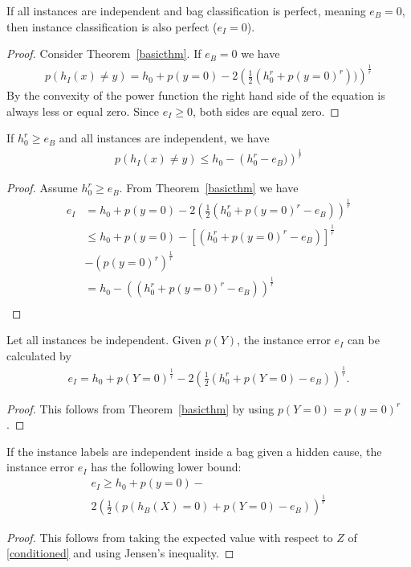 \begin{corollarya}
If all instances are independent and bag classification is perfect, meaning $e_B=0$, then instance classification is also perfect ($e_I =0$).

\begin{proof}
Consider Theorem~\ref{basicthm}. If $e_B=0$ we have
\begin{align*}
p(h_I(x) \neq y) = h_0 + p(y=0) - 2 \left (\frac{1}{2} ( h_0^r + p(y=0)^r)) \right)^\frac{1}{r}
\end{align*}
By the convexity of the power function the right hand side of the equation is always less or equal zero.
Since $e_I \geq 0$, both sides are equal zero.
\end{proof}
\end{corollarya}

\begin{theorema}
    If $h_0^r  \geq e_B$ and all instances are independent, we have
\begin{align}
    p(h_I(x)\neq y) \leq h_0 - \left ( h_0^r - e_B) \right ) ^ \frac{1}{r}
\end{align}
\begin{proof}
    Assume $h_0^r  \geq e_B$.
    From Theorem~\ref{basicthm} we have
\begin{align*}
   e_I &= h_0 + p(y=0) - 2 \left (\frac{1}{2} ( h_0^r + p(y=0)^r - e_B) \right)^\frac{1}{r}\\
   &\leq h_0 + p(y=0) - \left [( h_0^r + p(y=0)^r - e_B) \right]^\frac{1}{r}\\
   &- \left ( p(y=0)^r \right )^\frac{1}{r}\\
   &= h_0 - \left (( h_0^r + p(y=0)^r - e_B) \right)^\frac{1}{r}\\
\end{align*}
\end{proof}
\end{theorema}

\begin{theorema}
Let all instances be independent. Given $p(Y)$, the instance error $e_I$ can be calculated by
\begin{align}
e_I = h_0 + p(Y=0)^\frac{1}{r} - 2 \left (\frac{1}{2} ( h_0^r + p(Y=0) - e_B) \right)^\frac{1}{r}.
\end{align}
\begin{proof}
    This follows from Theorem~\ref{basicthm} by using $p(Y=0)=p(y=0)^r$.
\end{proof}
\end{theorema}


\begin{theorema}
If the instance labels are independent inside a bag given a hidden cause, the instance
error $e_I$ has the following lower bound:
\begin{multline*}
e_I \geq h_0 + p(y=0) - \\
2 \left (\frac{1}{2} (p(h_B(X)=0) + p(Y=0) - e_B) \right)^\frac{1}{r}
\end{multline*}
\begin{proof}
    This follows from taking the expected value with respect to $Z$ of \eqref{conditioned} and using Jensen's
    inequality.
\end{proof}
\end{theorema}
